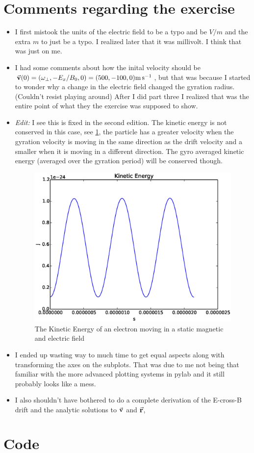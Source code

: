 \documentclass[x11names]{article}
\begin{document}
\appendix

\section{Comments regarding the exercise}
      \begin{itemize}
            \item I first mistook the units of the electric field to be a typo and be \(\si{V/m}\) and the extra \(m\) to just be a typo. I realized later that it was millivolt. I think that was just on me.
            \item I had some comments about how the inital velocity should be \(\va{v}(0) = (\omega_\perp, -E_x/B_0, 0 ) =(500,-100,0) \si{\meter\per\second}\), but that was because I started to wonder why a change in the electric field changed the gyration radius. (Couldn't resist playing around) After I did part three I realized that was the entire point of what they the exercise was supposed to show. 
            \item \textit{Edit:} I see this is fixed in the second edition. \newline
            The kinetic energy is not conserved in this case, see \cref{fig:kineticEnergy}, the particle has a greater velocity when the gyration velocity is moving in the same direction as the drift velocity and a smaller when it is moving in a different direction. The gyro averaged kinetic energy (averaged over the gyration period) will be conserved though.
                  \begin{figure}
                  \centering
                        \includegraphics[width = 0.5\linewidth] {../source/kineticEnergy}
                        \caption{The Kinetic Energy of an electron moving in a static magnetic and electric field}
                        \label{fig:kineticEnergy}
                  \end{figure}
            \item I ended up wasting way to much time to get equal aspects along with transforming the axes on the subplots. That was due to me not being that familiar with the more advanced plotting systems in pylab and it still probably looks like a mess.
            \item I also shouldn't have bothered to do a complete derivation of the E-cross-B drift and the analytic solutions to \(\va{v}\) and \( \va{r} \), 
      \end{itemize}

\newpage
\section{Code}
      \label{sec:code}
      

      
\end{document}
